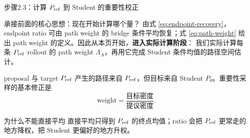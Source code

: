 \documentclass[10pt,aspectratio=169]{beamer}
\begin{document}
\begin{frame}{步骤2.3：计算 \ensuremath{P_{\rm ref}} 到 Student 的重要性校正}
\footnotesize
\begin{block}{承接前面的核心思想：现在开始计算哪个量？}
由式 \eqref{eq:endpoint-recovery}，endpoint ratio 可由 path weight 的 bridge 条件平均恢复；式
\eqref{eq:path-weight} 给出 path weight 的定义。因此从本页开始，\textbf{进入实际计算阶段}：
我们实际计算每条 $P_{\rm ref}$ rollout 的 path weight $\Lambda_A$，再用它完成 Student 条件均值的路径空间估计。
\end{block}
\begin{block}{proposal 与 target}
\ensuremath{P_{\rm ref}} 产生的路径来自 $P_{\rm ref}$，但目标来自 Student $P_\theta$。重要性采样的基本修正是
\begin{equation}
\text{weight}=\frac{\text{目标密度}}{\text{提议密度}}.
\end{equation}
\end{block}
\begin{center}
\end{center}
\begin{exampleblock}{为什么不能直接平均}
直接平均只得到 \ensuremath{P_{\rm ref}} 的终点均值；ratio 会把 \ensuremath{P_{\rm ref}} 更常走的地方降权，把 Student 更偏好的地方升权。
\end{exampleblock}
\end{frame}
\end{document}
